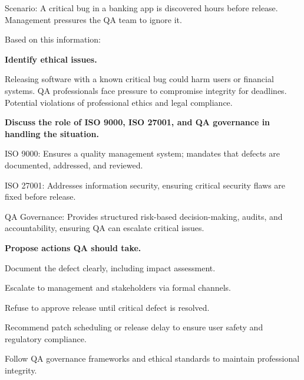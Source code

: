 \indent

Scenario: A critical bug in a banking app is discovered hours before release. Management pressures the QA team to ignore it.

Based on this information:

\bigskip

\noindent\textbf{Identify ethical issues.}

Releasing software with a known critical bug could harm users or financial systems. QA professionals face pressure to compromise integrity for deadlines. Potential violations of professional ethics and legal compliance.

\bigskip

\noindent\textbf{Discuss the role of ISO 9000, ISO 27001, and QA governance in handling the situation.}

ISO 9000: Ensures a quality management system; mandates that defects are documented, addressed, and reviewed.

ISO 27001: Addresses information security, ensuring critical security flaws are fixed before release.

QA Governance: Provides structured risk-based decision-making, audits, and accountability, ensuring QA can escalate critical issues.

\bigskip

\noindent\textbf{Propose actions QA should take.}

Document the defect clearly, including impact assessment.

Escalate to management and stakeholders via formal channels.

Refuse to approve release until critical defect is resolved.

Recommend patch scheduling or release delay to ensure user safety and regulatory compliance.

Follow QA governance frameworks and ethical standards to maintain professional integrity.